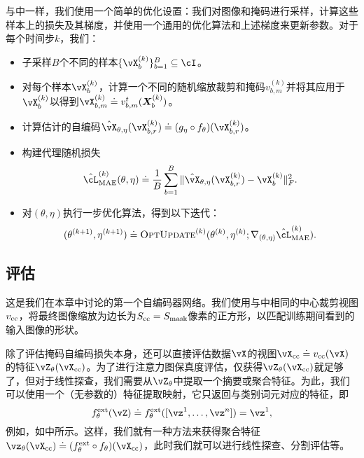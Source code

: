 \documentclass[../../book-main.tex]{subfiles}
\begin{document}
与中一样，我们使用一个简单的优化设置：我们对图像和掩码进行采样，计算这些样本上的损失及其梯度，并使用一个通用的优化算法和上述梯度来更新参数。对于每个时间步\(k\)，我们：
\begin{itemize}
    \item 子采样\(B\)个不同的样本\(\{\vX_{b}^{(k)}\}_{b = 1}^{B} \subseteq \cI\)。
    \item 对每个样本\(\vX_{b}^{(k)}\)，计算一个不同的随机缩放裁剪和掩码\(v_{b, m}^{(k)}\)并将其应用于\(\vX_{b}^{(k)}\)以得到\(\vX_{b, m}^{(k)} \doteq v_{b, m}^{t}(\X_{b}^{(k)})\)。
    \item 计算估计的自编码\(\hat{\vX}_{\theta, \eta}(\vX_{b, r}^{(k)}) \doteq (g_{\eta} \circ f_{\theta})(\vX_{b, r}^{(k)})\)。
    \item 构建代理随机损失
    \begin{equation}
        \hat{\cL}_{\mathrm{MAE}}^{(k)}(\theta, \eta) \doteq \frac{1}{B}\sum_{b = 1}^{B}\norm{\hat{\vX}_{\theta, \eta}(\vX_{b, r}^{(k)}) - \vX_{b}^{(k)}}_{F}^{2}.
    \end{equation}
    \item 对\((\theta, \eta)\)执行一步优化算法，得到以下迭代：
    \begin{equation}
        (\theta^{(k + 1)}, \eta^{(k + 1)}) \doteq \textsc{OptUpdate}^{(k)}(\theta^{(k)}, \eta^{(k)}; \nabla_{(\theta, \eta)}\hat{\cL}_{\mathrm{MAE}}^{(k)}).
    \end{equation}
\end{itemize}

\subsection{评估} \label{sub:image_completion_optimization_1}

这是我们在本章中讨论的第一个自编码器网络。我们使用与中相同的中心裁剪视图\(v_{\mathrm{cc}}\)，将最终图像缩放为边长为\(S_{\mathrm{cc}} = S_{\mathrm{mask}}\)像素的正方形，以匹配训练期间看到的输入图像的形状。

除了评估掩码自编码损失本身，还可以直接评估数据\(\vX\)的视图\(\vX_{\cc} \doteq v_{\cc}(\vX)\)的特征\(\vZ_{\theta}(\vX_{\cc})\)。为了进行注意力图保真度评估，仅获得\(\vZ_{\theta}(\vX_{\cc})\)就足够了，但对于线性探查，我们需要从\(\vZ_{\theta}\)中提取一个摘要或聚合特征。为此，我们可以使用一个（无参数的）特征提取映射，它只返回与类别词元对应的特征，即
\begin{equation}
    f_{\theta}^{\ext}(\vZ) \doteq f_{\theta}^{\ext}([\vz^{1}, \dots, \vz^{n}]) = \vz^{1},
\end{equation}
例如，如中所示。这样，我们就有一种方法来获得聚合特征\(\vz_{\theta}(\vX_{\cc}) \doteq (f_{\theta}^{\ext} \circ f_{\theta})(\vX_{\cc})\)，此时我们就可以进行线性探查、分割评估等。
\end{document}
